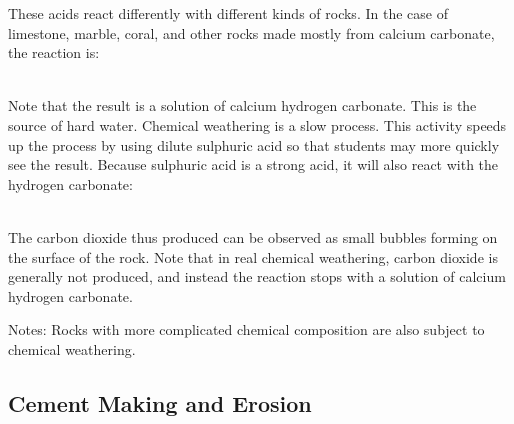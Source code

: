 \begin{multicols}{2}
\begin{description*}
{These acids react differently with different kinds of rocks. In the case of limestone, marble, coral, and other rocks made mostly from calcium carbonate, the reaction is:\\

\centering
{}\\	
\raggedright

Note that the result is a solution of calcium hydrogen carbonate. This is the source of hard water.
Chemical weathering is a slow process. This activity speeds up the process by using dilute sulphuric acid so that students may more quickly see the result. Because sulphuric acid is a strong acid, it will also react with the hydrogen carbonate:\\

\centering
{}\\	
\raggedright

The carbon dioxide thus produced can be observed as small bubbles forming on the surface of the rock. Note that in real chemical weathering, carbon dioxide is generally not produced, and instead the reaction stops with a solution of calcium hydrogen carbonate.}
\item[Notes:]{Rocks with more complicated chemical composition are also subject to chemical weathering.}
\end{description*}

\vfill
\columnbreak

\subsection{Cement Making and Erosion} 



\end{multicols}
